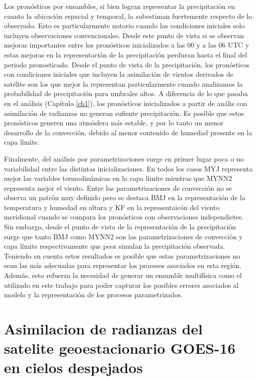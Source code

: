 \documentclass[12pt,oneside,a4paper]{reedthesis}
\begin{document}
Los pronósticos por ensambles, si bien logran representar la precipitación en cuanto la ubicación espacial y temporal, la subestiman fuertemente respecto de lo observado. Esto es particularmente notorio cuando las condiciones iniciales solo incluyen observaciones convencionales. Desde este punto de vista si se observan mejoras importantes entre los pronósticos inicializados a las 00 y a las 06 UTC y estas mejoras en la representación de la precipitación perduran hasta el final del periodo pronosticado. Desde el punto de vista de la precipitación, los pronósticos con condiciones iniciales que incluyen la asimilación de vientos derivados de satélite son los que mejor la representan particularmente cuando analizamos la probabilidad de precipitación para umbrales altos. A diferencia de lo que pasaba en el análisis (Capítulo \ref{ch1}), los pronósticos inicializados a partir de anális con asimilación de radianzas no generan sufiente precipitación. Es posible que estos pronósticos generen una atmósfera más estable, y por lo tanto un menor desarrollo de la convección, debido al menor contenido de humedad presente en la capa límite.

Finalmente, del análisis por parametrizaciones surge en primer lugar poca o no variabilidad entre las distintas inicializaciones. En todos los casos MYJ representa mejor las variables termodinámicas en la capa límite mientras que MYNN2 representa mejor el viento. Entre las parametrizaciones de convección no se observa un patrón muy definido pero se destaca BMJ en la representación de la temperatura y humedad en altura y KF en la representaicón del viento meridional cuando se compara los pronósticos con observaciones independietes. Sin embargo, desde el punto de vista de la representación de la precipitación surge que tanto BMJ como MYNN2 son las parametrizaciones de convección y capa límite respectivamente que peor simulan la precipitación observada. Teniendo en cuenta estos resultados es posible que estas parametrizaciones no sean las más adecuadas para representar los procesos asociados en esta región. Además, esto refuerza la necesidad de generar un ensamble multifísica como el utilizado en este trabajo para poder capturar los posibles errores asociados al modelo y la representación de los procesos parametrizados.

\hypertarget{asimilacion-de-radianzas-del-satelite-geoestacionario-goes-16-en-cielos-despejados}{%
\chapter{Asimilacion de radianzas del satelite geoestacionario GOES-16 en cielos despejados}\label{asimilacion-de-radianzas-del-satelite-geoestacionario-goes-16-en-cielos-despejados}}
\end{document}

